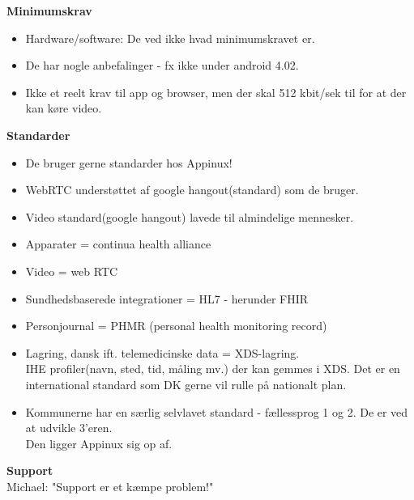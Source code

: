 \textbf{Minimumskrav}
\begin{itemize}
	\item Hardware/software: De ved ikke hvad minimumskravet er.
	\item De har nogle anbefalinger - fx ikke under android 4.02.
	\item Ikke et reelt krav til app og browser, men der skal 512 kbit/sek til for at der kan køre video.
\end{itemize}


\textbf{Standarder}
\begin{itemize}
	\item De bruger gerne standarder hos Appinux!
	\item WebRTC understøttet af google hangout(standard) som de bruger. 
	\item Video standard(google hangout) lavede til almindelige mennesker.
	\item Apparater = continua health alliance
	\item Video = web RTC
	\item Sundhedsbaserede integrationer = HL7 - herunder FHIR
	\item Personjournal = PHMR (personal health monitoring record)
	\item Lagring, dansk ift. telemedicinske data = XDS-lagring. \\IHE profiler(navn, sted, tid, måling mv.) der kan gemmes i XDS. Det er en international standard som DK gerne vil rulle på nationalt plan.
	\item Kommunerne har en særlig selvlavet standard - fællessprog 1 og 2. De er ved at udvikle 3'eren. \\ Den ligger Appinux sig op af. 
\end{itemize}


\textbf{Support} 
\\
Michael: "Support er et kæmpe problem!" \\


